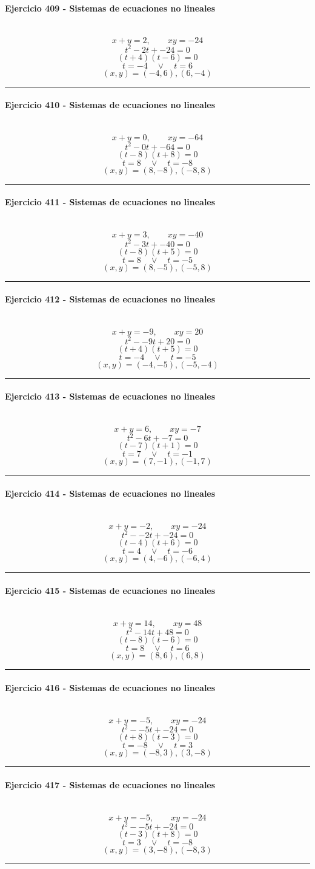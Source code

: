 \documentclass[10pt,a4paper]{article}
\newcommand{\res}[1]{\paragraph{#1}\mbox{}\\[-1.2em]}
\begin{document}
\res{Ejercicio 409 - Sistemas de ecuaciones no lineales}
\[ x+y=2,\qquad xy=-24 \]
\[ t^2-2t+-24=0 \]
\[ (t+4)(t-6)=0 \]
\[ t=-4\quad \vee \quad t=6 \]
\[ \boxed{(x,y)=(-4,6),(6,-4)} \]
\vspace{1mm}\hrule\vspace{2mm}
\res{Ejercicio 410 - Sistemas de ecuaciones no lineales}
\[ x+y=0,\qquad xy=-64 \]
\[ t^2-0t+-64=0 \]
\[ (t-8)(t+8)=0 \]
\[ t=8\quad \vee \quad t=-8 \]
\[ \boxed{(x,y)=(8,-8),(-8,8)} \]
\vspace{1mm}\hrule\vspace{2mm}
\res{Ejercicio 411 - Sistemas de ecuaciones no lineales}
\[ x+y=3,\qquad xy=-40 \]
\[ t^2-3t+-40=0 \]
\[ (t-8)(t+5)=0 \]
\[ t=8\quad \vee \quad t=-5 \]
\[ \boxed{(x,y)=(8,-5),(-5,8)} \]
\vspace{1mm}\hrule\vspace{2mm}
\res{Ejercicio 412 - Sistemas de ecuaciones no lineales}
\[ x+y=-9,\qquad xy=20 \]
\[ t^2--9t+20=0 \]
\[ (t+4)(t+5)=0 \]
\[ t=-4\quad \vee \quad t=-5 \]
\[ \boxed{(x,y)=(-4,-5),(-5,-4)} \]
\vspace{1mm}\hrule\vspace{2mm}
\res{Ejercicio 413 - Sistemas de ecuaciones no lineales}
\[ x+y=6,\qquad xy=-7 \]
\[ t^2-6t+-7=0 \]
\[ (t-7)(t+1)=0 \]
\[ t=7\quad \vee \quad t=-1 \]
\[ \boxed{(x,y)=(7,-1),(-1,7)} \]
\vspace{1mm}\hrule\vspace{2mm}
\res{Ejercicio 414 - Sistemas de ecuaciones no lineales}
\[ x+y=-2,\qquad xy=-24 \]
\[ t^2--2t+-24=0 \]
\[ (t-4)(t+6)=0 \]
\[ t=4\quad \vee \quad t=-6 \]
\[ \boxed{(x,y)=(4,-6),(-6,4)} \]
\vspace{1mm}\hrule\vspace{2mm}
\res{Ejercicio 415 - Sistemas de ecuaciones no lineales}
\[ x+y=14,\qquad xy=48 \]
\[ t^2-14t+48=0 \]
\[ (t-8)(t-6)=0 \]
\[ t=8\quad \vee \quad t=6 \]
\[ \boxed{(x,y)=(8,6),(6,8)} \]
\vspace{1mm}\hrule\vspace{2mm}
\res{Ejercicio 416 - Sistemas de ecuaciones no lineales}
\[ x+y=-5,\qquad xy=-24 \]
\[ t^2--5t+-24=0 \]
\[ (t+8)(t-3)=0 \]
\[ t=-8\quad \vee \quad t=3 \]
\[ \boxed{(x,y)=(-8,3),(3,-8)} \]
\vspace{1mm}\hrule\vspace{2mm}
\res{Ejercicio 417 - Sistemas de ecuaciones no lineales}
\[ x+y=-5,\qquad xy=-24 \]
\[ t^2--5t+-24=0 \]
\[ (t-3)(t+8)=0 \]
\[ t=3\quad \vee \quad t=-8 \]
\[ \boxed{(x,y)=(3,-8),(-8,3)} \]
\vspace{1mm}\hrule\vspace{2mm}
\end{document}
